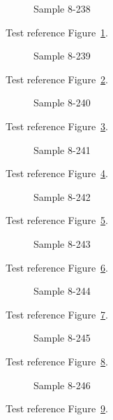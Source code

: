 \begin{figure}[tbhp]
\caption{Sample 8-238}
\label{fig:sample-8-238}
\end{figure}

Test reference Figure~\ref{fig:sample-8-238}.

\begin{figure}[tbhp]
\caption{Sample 8-239}
\label{fig:sample-8-239}
\end{figure}

Test reference Figure~\ref{fig:sample-8-239}.

\begin{figure}[tbhp]
\caption{Sample 8-240}
\label{fig:sample-8-240}
\end{figure}

Test reference Figure~\ref{fig:sample-8-240}.

\begin{figure}[tbhp]
\caption{Sample 8-241}
\label{fig:sample-8-241}
\end{figure}

Test reference Figure~\ref{fig:sample-8-241}.

\begin{figure}[tbhp]
\caption{Sample 8-242}
\label{fig:sample-8-242}
\end{figure}

Test reference Figure~\ref{fig:sample-8-242}.

\begin{figure}[tbhp]
\caption{Sample 8-243}
\label{fig:sample-8-243}
\end{figure}

Test reference Figure~\ref{fig:sample-8-243}.

\begin{figure}[tbhp]
\caption{Sample 8-244}
\label{fig:sample-8-244}
\end{figure}

Test reference Figure~\ref{fig:sample-8-244}.

\begin{figure}[tbhp]
\caption{Sample 8-245}
\label{fig:sample-8-245}
\end{figure}

Test reference Figure~\ref{fig:sample-8-245}.

\begin{figure}[tbhp]
\caption{Sample 8-246}
\label{fig:sample-8-246}
\end{figure}

Test reference Figure~\ref{fig:sample-8-246}.

